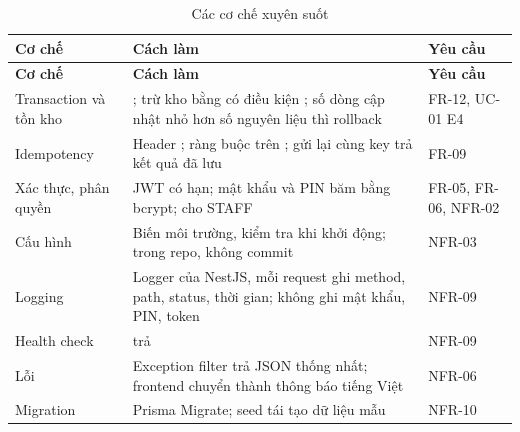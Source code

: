{\small
\begin{longtable}{@{}L{2.8cm}L{8.4cm}L{2.7cm}@{}}
\caption{Các cơ chế xuyên suốt}\label{tab:xuyensuot}\\
\toprule
\textbf{Cơ chế} & \textbf{Cách làm} & \textbf{Yêu cầu} \\ \midrule \endfirsthead
\toprule \textbf{Cơ chế} & \textbf{Cách làm} & \textbf{Yêu cầu} \\ \midrule \endhead
\bottomrule \endfoot
Transaction và tồn kho & ; trừ kho bằng  có điều kiện ; số dòng cập nhật nhỏ hơn số nguyên liệu thì rollback & FR-12, UC-01 E4 \\
Idempotency & Header ; ràng buộc  trên ; gửi lại cùng key trả kết quả đã lưu & FR-09 \\
Xác thực, phân quyền & JWT có hạn; mật khẩu và PIN băm bằng bcrypt;  cho STAFF & FR-05, FR-06, NFR-02 \\
Cấu hình & Biến môi trường, kiểm tra khi khởi động;  trong repo,  không commit & NFR-03 \\
Logging & Logger của NestJS, mỗi request ghi method, path, status, thời gian; không ghi mật khẩu, PIN, token & NFR-09 \\
Health check &  trả  & NFR-09 \\
Lỗi & Exception filter trả JSON thống nhất; frontend chuyển thành thông báo tiếng Việt & NFR-06 \\
Migration & Prisma Migrate; seed tái tạo dữ liệu mẫu & NFR-10 \\
\end{longtable}
}